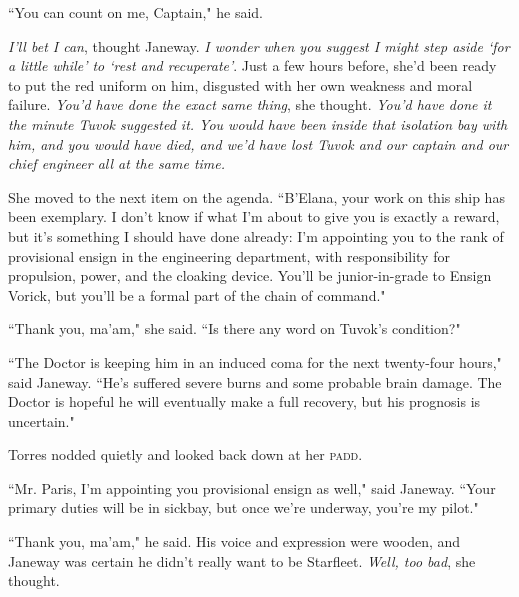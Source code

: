 \documentclass[twoside,letterpaper,12pt]{memoir}
\begin{document}
``You can count on me, Captain," he said. 

\textit{I'll bet I can}, thought Janeway. \textit{I wonder when you suggest I might step aside `for a little while' to `rest and recuperate'}. Just a few hours before, she'd been ready to put the red uniform on him, disgusted with her own weakness and moral failure. \textit{You'd have done the exact same thing}, she thought. \textit{You'd have done it the minute Tuvok suggested it. You would have been inside that isolation bay with him, and you would have died, and we'd have lost Tuvok and our captain and our chief engineer all at the same time. }

She moved to the next item on the agenda. ``B'Elana, your work on this ship has been exemplary. I don't know if what I'm about to give you is exactly a reward, but it's something I should have done already: I'm appointing you to the rank of provisional ensign in the engineering department, with responsibility for propulsion, power, and the cloaking device. You'll be junior-in-grade to Ensign Vorick, but you'll be a formal part of the chain of command." 

``Thank you, ma'am," she said. ``Is there any word on Tuvok's condition?" 

``The Doctor is keeping him in an induced coma for the next twenty-four hours," said Janeway. ``He's suffered severe burns and some probable brain damage. The Doctor is hopeful he will eventually make a full recovery, but his prognosis is uncertain." 

Torres nodded quietly and looked back down at her \textsc{padd}. 

``Mr. Paris, I'm appointing you provisional ensign as well," said Janeway. ``Your primary duties will be in sickbay, but once we're underway, you're my pilot." 

``Thank you, ma'am," he said. His voice and expression were wooden, and Janeway was certain he didn't really want to be Starfleet. \textit{Well, too bad}, she thought. 
\end{document}
